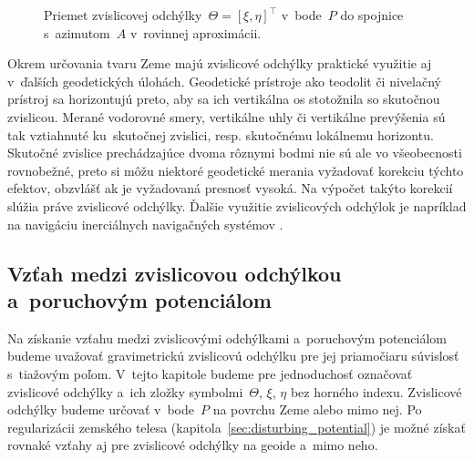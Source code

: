 \documentclass[a4paper, 12pt]{book}
\begin{document}
\begin{figure}[bt]
\centering

\caption{Priemet zvislicovej odchýlky~$\Theta = [\xi, \eta]^\top$ v~bode~$P$ do 
spojnice s~azimutom~$A$ v~rovinnej aproximácii.}
\label{fig:deflections_projection}
\end{figure}

Okrem určovania tvaru Zeme majú zvislicové odchýlky praktické využitie aj 
v~ďalších geodetických úlohách.  Geodetické prístroje ako teodolit či nivelačný 
prístroj sa horizontujú preto, aby sa ich vertikálna os stotožnila so skutočnou 
zvislicou.  Merané vodorovné smery, vertikálne uhly či vertikálne prevýšenia sú 
tak vztiahnuté ku~skutočnej zvislici, resp. skutočnému lokálnemu horizontu.  
Skutočné zvislice prechádzajúce dvoma rôznymi bodmi nie sú ale vo všeobecnosti 
rovnobežné, preto si môžu niektoré geodetické merania vyžadovať korekciu týchto 
efektov, obzvlášť ak je vyžadovaná presnosť vysoká.  Na výpočet takýto korekcií 
slúžia práve zvislicové odchýlky.  Ďalšie využitie zvislicových odchýlok je 
napríklad na navigáciu inerciálnych navigačných systémov \parencite[pozri 
napríklad][]{Jekeli2000}.


\subsection{Vzťah medzi zvislicovou odchýlkou a~poruchovým potenciálom}
\label{sec:deflections_disturbing_potential}

Na získanie vzťahu medzi zvislicovými odchýlkami a~poruchovým potenciálom 
budeme uvažovať gravimetrickú zvislicovú odchýlku pre jej priamočiaru súvislosť 
s~tiažovým poľom.  V~tejto kapitole budeme pre jednoduchosť označovať 
zvislicové odchýlky a~ich zložky symbolmi~$\Theta$, $\xi$, $\eta$ bez horného 
indexu.  Zvislicové odchýlky budeme určovať v~bode~$P$ na povrchu Zeme alebo 
mimo nej.  Po regularizácii zemského telesa 
(kapitola~\ref{sec:disturbing_potential}) je možné získať rovnaké vzťahy aj pre 
zvislicové odchýlky na geoide a~mimo neho.
\end{document}
